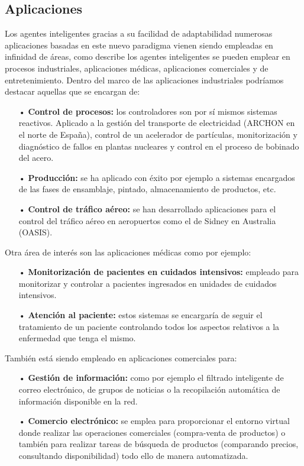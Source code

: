 \subsection{Aplicaciones}
Los agentes inteligentes gracias a su facilidad de adaptabilidad numerosas aplicaciones basadas en este nuevo paradigma vienen siendo empleadas en infinidad de áreas, como describe \cite{Julian} los agentes inteligentes se pueden emplear en procesos industriales, aplicaciones médicas, aplicaciones comerciales y de entretenimiento.
\vskip 0.1cm
Dentro del marco de las aplicaciones industriales podríamos destacar aquellas que se encargan de:

\begin{itemize}
\item[•] {\bf Control de procesos:} 
los controladores son por sí mismos sistemas reactivos. Aplicado a la gestión del transporte de electricidad (ARCHON en el norte de España), control de un acelerador de partículas, monitorización y diagnóstico de fallos en plantas nucleares y control en el proceso de bobinado del acero.

\item[•] {\bf Producción:} 
se ha aplicado con éxito por ejemplo a sistemas encargados de las fases de ensamblaje, pintado, almacenamiento de productos, etc.\vskip 0.1cm
\item[•] {\bf Control de tráfico aéreo:} 
se han desarrollado aplicaciones para el control del tráfico aéreo en aeropuertos como el de Sidney en Australia (OASIS).
\end{itemize}

Otra área de interés son las aplicaciones médicas como por ejemplo:

\begin{itemize}
\item[•] {\bf Monitorización de pacientes en cuidados intensivos:}
empleado para monitorizar y controlar a pacientes ingresados en unidades de cuidados intensivos.
\item[•] {\bf Atención al paciente:}
estos sistemas se encargaría de seguir el tratamiento de un paciente controlando todos los aspectos relativos a la enfermedad que tenga el mismo.
\end{itemize}

También está siendo empleado en aplicaciones comerciales para:

\begin{itemize}
\item[•] {\bf Gestión de información:} 
como por ejemplo el filtrado inteligente de correo electrónico, de grupos de noticias o la recopilación automática de información disponible en la red.

\item[•] {\bf Comercio electrónico:} 
se emplea para proporcionar el entorno virtual donde realizar las operaciones comerciales (compra-venta de productos) o también para realizar tareas de búsqueda de productos (comparando precios, consultando disponibilidad) todo ello de manera automatizada.
\end{itemize}

